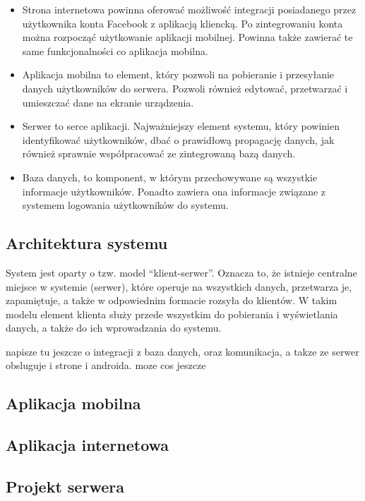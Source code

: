 \documentclass[10pt,titlepage]{article}
\begin{document}
\begin{itemize} %
 \item Strona internetowa powinna oferować możliwość integracji posiadanego przez użytkownika konta Facebook z aplikacją kliencką.
 Po zintegrowaniu konta można rozpocząć użytkowanie aplikacji mobilnej. Powinna także zawierać te same funkcjonalności co aplikacja mobilna.
 \item Aplikacja mobilna to element, który pozwoli na pobieranie i przesyłanie danych użytkowników do serwera. Pozwoli również edytować, przetwarzać i umieszczać
dane na ekranie urządzenia. 
 \item Serwer to serce aplikacji. Najważniejszy element systemu, który powinien identyfikować użytkowników, dbać o prawidłową propagację danych, jak również
 sprawnie współpracować ze zintegrowaną bazą danych.
 \item Baza danych, to komponent, w którym przechowywane są wszystkie informacje użytkowników. Ponadto zawiera ona informacje związane z systemem logowania użytkowników do systemu.
\end{itemize}

\subsection{Architektura systemu}
System jest oparty o tzw. model ``klient-serwer''. Oznacza to, że istnieje centralne miejsce w systemie (serwer), które operuje na wszystkich danych, przetwarza je, zapamiętuje, a także w odpowiednim
formacie rozsyła do klientów. W takim modelu element klienta służy przede wszystkim do pobierania i wyświetlania danych, a także do ich wprowadzania do systemu.

napisze tu jeszcze o integracji z baza danych, oraz komunikacja, a takze ze serwer obsluguje i strone i androida. moze cos jeszcze

\subsection{Aplikacja mobilna}

\subsection{Aplikacja internetowa}

\subsection{Projekt serwera}
\end{document}
